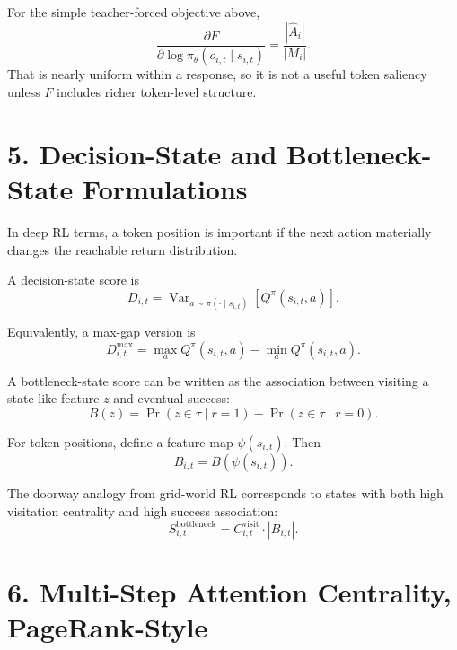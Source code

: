 \documentclass[11pt]{article}
\newcommand{\Var}{\operatorname{Var}}
\begin{document}
For the simple teacher-forced objective above,
\begin{equation}
  \frac{\partial F}{\partial \log \pi_\theta(o_{i,t} \mid s_{i,t})}
  =
  \frac{|\hat A_i|}{|M_i|}.
\end{equation}
That is nearly uniform within a response, so it is not a useful token saliency
unless $F$ includes richer token-level structure.

\section*{5. Decision-State and Bottleneck-State Formulations}

In deep RL terms, a token position is important if the next action materially
changes the reachable return distribution.

A decision-state score is
\begin{equation}
  D_{i,t}
  =
  \Var_{a \sim \pi(\cdot \mid s_{i,t})}
  \left[
    Q^\pi(s_{i,t}, a)
  \right].
\end{equation}

Equivalently, a max-gap version is
\begin{equation}
  D^{\max}_{i,t}
  =
  \max_a Q^\pi(s_{i,t}, a)
  -
  \min_a Q^\pi(s_{i,t}, a).
\end{equation}

A bottleneck-state score can be written as the association between visiting a
state-like feature $z$ and eventual success:
\begin{equation}
  B(z)
  =
  \Pr(z \in \tau \mid r=1)
  -
  \Pr(z \in \tau \mid r=0).
\end{equation}

For token positions, define a feature map $\psi(s_{i,t})$. Then
\begin{equation}
  B_{i,t}
  =
  B(\psi(s_{i,t})).
\end{equation}

The doorway analogy from grid-world RL corresponds to states with both high
visitation centrality and high success association:
\begin{equation}
  S^{\mathrm{bottleneck}}_{i,t}
  =
  C^{\mathrm{visit}}_{i,t}
  \cdot
  \left|B_{i,t}\right|.
\end{equation}

\section*{6. Multi-Step Attention Centrality, PageRank-Style}
\end{document}
